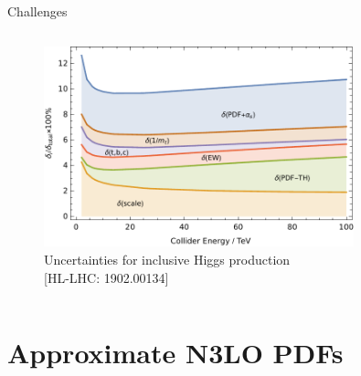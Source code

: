 \documentclass[aspectratio=169, 8pt,t]{beamer}
\begin{document}
\begin{frame}{Challenges}
\begin{columns}
    \begin{column}{0.49\textwidth}
      \begin{figure}
        \includegraphics[width=0.8\textwidth]{figures/sources_of_unceratinty.pdf}
        \caption*{Uncertainties for inclusive Higgs production \\ 
        \color{gray}\small [HL-LHC: 1902.00134]}
      \end{figure}
    \end{column}
  \end{columns}
\end{frame}


\section{Approximate N3LO PDFs}
\end{document}

